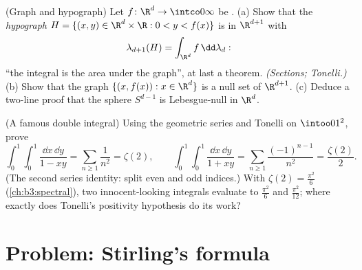 \begin{exercise}[$\star\star$]\label{exo:b3:product:11}
(Graph and hypograph) Let $f \colon \R^d \to \intco0\infty$
be .
(a) Show that the \emph{hypograph} $H = \{(x, y) \in
\R^d\times\R : 0 < y < f(x)\}$ is  in
$\R^{d+1}$ with
\[
\lambda_{d+1}(H) = \int_{\R^d}f\,\dd\lambda_d :
\]
``the integral is the area under the graph'', at last a
theorem. \emph{(Sections; Tonelli.)}
(b) Show that the graph $\{(x, f(x)) : x \in \R^d\}$ is a
null set of $\R^{d+1}$.
(c) Deduce a two-line proof that the sphere $S^{d-1}$ is
Lebesgue-null in $\R^d$.
\end{exercise}

\begin{exercise}[$\star\star$]\label{exo:b3:product:12}
(A famous double integral) Using the geometric series and
Tonelli on $\intoo01^2$, prove
\[
\int_0^1\!\!\int_0^1\frac{\dd x\,\dd y}{1 - xy}
= \sum_{n\geq1}\frac1{n^2} = \zeta(2),
\qquad
\int_0^1\!\!\int_0^1\frac{\dd x\,\dd y}{1 + xy}
= \sum_{n\geq1}\frac{(-1)^{n-1}}{n^2} = \frac{\zeta(2)}2 .
\]
(The second series identity: split even and odd indices.)
With $\zeta(2) = \frac{\pi^2}6$ (\cref{ch:b3:spectral}), two
innocent-looking integrals evaluate to $\frac{\pi^2}6$ and
$\frac{\pi^2}{12}$; where exactly does Tonelli's positivity
hypothesis do its work?
\end{exercise}

\section{Problem: Stirling's formula}

